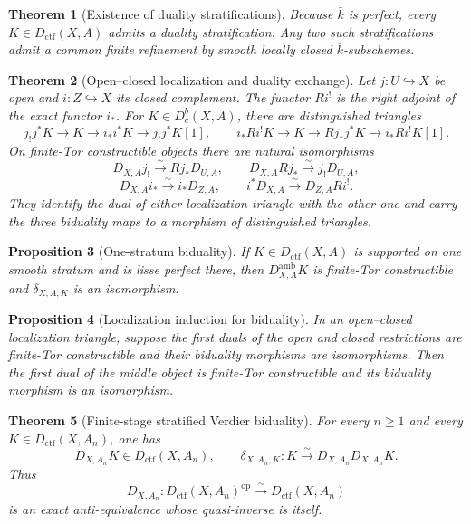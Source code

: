 \documentclass[10pt]{article}
\newtheorem{theorem}{Theorem}[section]
\newtheorem{proposition}[theorem]{Proposition}
\theoremstyle{definition}
\begin{document}
\begin{theorem}[Existence of duality stratifications]
Because \(\bar k\) is perfect, every
\(K\in D_{\mathrm{ctf}}(X,A)\) admits a duality stratification.  Any two
such stratifications admit a common finite refinement by smooth locally
closed \(\bar k\)-subschemes.
\end{theorem}

\begin{theorem}[Open--closed localization and duality exchange]
Let \(j:U\hookrightarrow X\) be open and \(i:Z\hookrightarrow X\) its
closed complement.  The functor \(Ri^!\) is the right adjoint of the exact
functor \(i_*\).  For \(K\in D^b_c(X,A)\), there are distinguished
triangles
\[
 j_!j^*K\to K\to i_*i^*K\to j_!j^*K[1],
\qquad
 i_*Ri^!K\to K\to Rj_*j^*K\to i_*Ri^!K[1].
\]
On finite-Tor constructible objects there are natural isomorphisms
\[
 D_{X,A}j_!\xrightarrow{\sim}Rj_*D_{U,A},
 \qquad D_{X,A}Rj_*\xrightarrow{\sim}j_!D_{U,A},
\]
\[
 D_{X,A}i_*\xrightarrow{\sim}i_*D_{Z,A},
 \qquad i^*D_{X,A}\xrightarrow{\sim}D_{Z,A}Ri^!.
\]
They identify the dual of either localization triangle with the other one
and carry the three biduality maps to a morphism of distinguished triangles.
\end{theorem}

\begin{proposition}[One-stratum biduality]
If \(K\in D_{\mathrm{ctf}}(X,A)\) is supported on one smooth stratum and is
lisse perfect there, then \(D_{X,A}^{\mathrm{amb}}K\) is finite-Tor
constructible and \(\delta_{X,A,K}\) is an isomorphism.
\end{proposition}

\begin{proposition}[Localization induction for biduality]
In an open--closed localization triangle, suppose the first duals of the
open and closed restrictions are finite-Tor constructible and their
biduality morphisms are isomorphisms.  Then the first dual of the middle
object is finite-Tor constructible and its biduality morphism is an
isomorphism.
\end{proposition}

\begin{theorem}[Finite-stage stratified Verdier biduality]
For every \(n\ge1\) and every
\(K\in D_{\mathrm{ctf}}(X,A_n)\), one has
\[
 D_{X,A_n}K\in D_{\mathrm{ctf}}(X,A_n),
 \qquad
 \delta_{X,A_n,K}:K\xrightarrow{\sim}D_{X,A_n}D_{X,A_n}K.
\]
Thus
\[
 D_{X,A_n}:D_{\mathrm{ctf}}(X,A_n)^{\mathrm{op}}
       \xrightarrow{\sim}D_{\mathrm{ctf}}(X,A_n)
\]
is an exact anti-equivalence whose quasi-inverse is itself.
\end{theorem}
\end{document}
